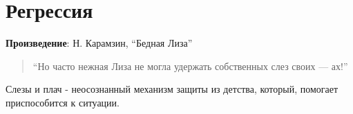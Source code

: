 \section{Регрессия}

\textbf{Произведение}: Н. Карамзин, “Бедная Лиза”

\begin{quote}
    “Но часто нежная Лиза не могла удержать собственных слез своих — ах!”
\end{quote}

Слезы и плач - неосознанный механизм защиты из детства, который, помогает приспособится к ситуации. 
